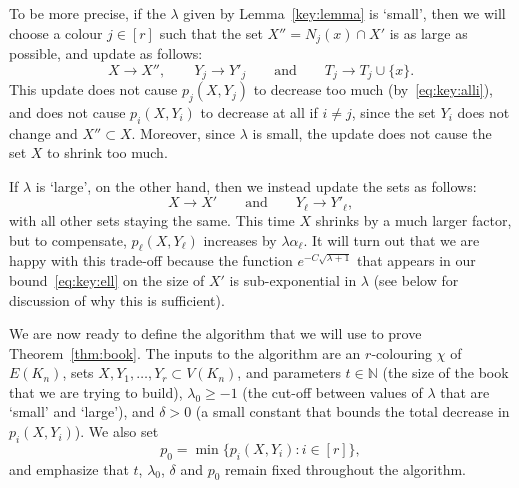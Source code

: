 \documentclass[12pt,reqno]{amsart}
\theoremstyle{definition}
\theoremstyle{remark}
\newcommand\N{\mathbb{N}}
\renewcommand{\ge}{\geqslant}
\renewcommand{\to}{\rightarrow}
\def\N{\mathbb{N}}
\begin{document}
To be more precise, if the $\lambda$ given by Lemma~\ref{key:lemma} is `small', then we will choose a colour $j \in [r]$ such that the set $X'' = N_j(x) \cap X'$ is as large as possible, and update as follows:
$$X \to X'', \qquad Y_j \to Y'_j \qquad \text{and} \qquad T_j \to T_j \cup \{x\}.$$
This update does not cause $p_j(X,Y_j)$ to decrease too much (by~\eqref{eq:key:alli}), and does not cause $p_i(X,Y_i)$ to decrease at all if $i \ne j$, since the set $Y_i$ does not change and $X'' \subset X$. Moreover, since $\lambda$ is small, the update does not cause the set $X$ to shrink too much. 

If $\lambda$ is `large', on the other hand, then we instead update the sets as follows:
$$X \to X' \qquad \text{and} \qquad Y_\ell \to Y'_\ell,$$
with all other sets staying the same. This time $X$ shrinks by a much larger factor, but to compensate, $p_\ell(X,Y_\ell)$ increases by $\lambda \alpha_\ell$. It will turn out that we are happy with this trade-off because the function $e^{- C \sqrt{\lambda + 1}}$ that appears in our bound~\eqref{eq:key:ell} on the size of $X'$ is sub-exponential in $\lambda$ (see below for discussion of why this is sufficient). 

We are now ready to define the algorithm that we will use to prove Theorem~\ref{thm:book}. The inputs to the algorithm are an $r$-colouring $\chi$ of $E(K_n)$, %
sets $X,Y_1,\ldots, Y_r \subset V(K_n)$, and parameters $t \in \N$ (the size of the book that we are trying to build), $\lambda_0 \ge -1$ (the cut-off between values of $\lambda$ that are `small' and `large'), and $\delta > 0$ (a small constant that bounds the total decrease in $p_i(X,Y_i)$). We also set  
$$p_0 = \min\big\{ p_i(X,Y_i) : i \in [r] \big\},$$
and emphasize that $t$, $\lambda_0$, $\delta$ and $p_0$ remain fixed throughout the algorithm. 
\end{document}
